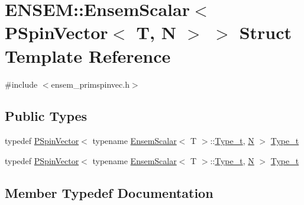 \hypertarget{structENSEM_1_1EnsemScalar_3_01PSpinVector_3_01T_00_01N_01_4_01_4}{}\section{E\+N\+S\+EM\+:\+:Ensem\+Scalar$<$ P\+Spin\+Vector$<$ T, N $>$ $>$ Struct Template Reference}
\label{structENSEM_1_1EnsemScalar_3_01PSpinVector_3_01T_00_01N_01_4_01_4}


{\ttfamily \#include $<$ensem\+\_\+primspinvec.\+h$>$}

\subsection*{Public Types}
\begin{DoxyCompactItemize}
\item 
typedef \mbox{\hyperlink{classENSEM_1_1PSpinVector}{P\+Spin\+Vector}}$<$ typename \mbox{\hyperlink{structENSEM_1_1EnsemScalar}{Ensem\+Scalar}}$<$ T $>$\+::\mbox{\hyperlink{structENSEM_1_1EnsemScalar_3_01PSpinVector_3_01T_00_01N_01_4_01_4_aef6767dcaa0dee58e84534fb1554dd11}{Type\+\_\+t}}, \mbox{\hyperlink{operator__name__util_8cc_a7722c8ecbb62d99aee7ce68b1752f337}{N}} $>$ \mbox{\hyperlink{structENSEM_1_1EnsemScalar_3_01PSpinVector_3_01T_00_01N_01_4_01_4_aef6767dcaa0dee58e84534fb1554dd11}{Type\+\_\+t}}
\item 
typedef \mbox{\hyperlink{classENSEM_1_1PSpinVector}{P\+Spin\+Vector}}$<$ typename \mbox{\hyperlink{structENSEM_1_1EnsemScalar}{Ensem\+Scalar}}$<$ T $>$\+::\mbox{\hyperlink{structENSEM_1_1EnsemScalar_3_01PSpinVector_3_01T_00_01N_01_4_01_4_aef6767dcaa0dee58e84534fb1554dd11}{Type\+\_\+t}}, \mbox{\hyperlink{operator__name__util_8cc_a7722c8ecbb62d99aee7ce68b1752f337}{N}} $>$ \mbox{\hyperlink{structENSEM_1_1EnsemScalar_3_01PSpinVector_3_01T_00_01N_01_4_01_4_aef6767dcaa0dee58e84534fb1554dd11}{Type\+\_\+t}}
\end{DoxyCompactItemize}


\subsection{Member Typedef Documentation}
\mbox{\label{structENSEM_1_1EnsemScalar_3_01PSpinVector_3_01T_00_01N_01_4_01_4_aef6767dcaa0dee58e84534fb1554dd11}} 
